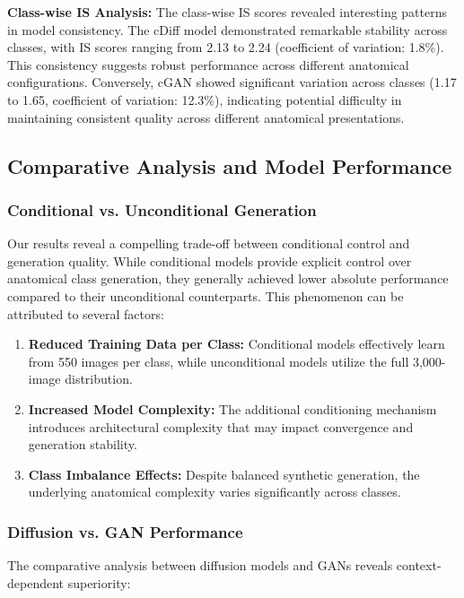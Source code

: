\textbf{Class-wise IS Analysis:} The class-wise IS scores revealed interesting patterns in model consistency. The cDiff model demonstrated remarkable stability across classes, with IS scores ranging from 2.13 to 2.24 (coefficient of variation: 1.8\%). This consistency suggests robust performance across different anatomical configurations. Conversely, cGAN showed significant variation across classes (1.17 to 1.65, coefficient of variation: 12.3\%), indicating potential difficulty in maintaining consistent quality across different anatomical presentations.

\subsection{Comparative Analysis and Model Performance}

\subsubsection{Conditional vs. Unconditional Generation}

Our results reveal a compelling trade-off between conditional control and generation quality. While conditional models provide explicit control over anatomical class generation, they generally achieved lower absolute performance compared to their unconditional counterparts. This phenomenon can be attributed to several factors:

\begin{enumerate}
    \item \textbf{Reduced Training Data per Class:} Conditional models effectively learn from 550 images per class, while unconditional models utilize the full 3,000-image distribution.
    \item \textbf{Increased Model Complexity:} The additional conditioning mechanism introduces architectural complexity that may impact convergence and generation stability.
    \item \textbf{Class Imbalance Effects:} Despite balanced synthetic generation, the underlying anatomical complexity varies significantly across classes.
\end{enumerate}

\subsubsection{Diffusion vs. GAN Performance}

The comparative analysis between diffusion models and GANs reveals context-dependent superiority:

